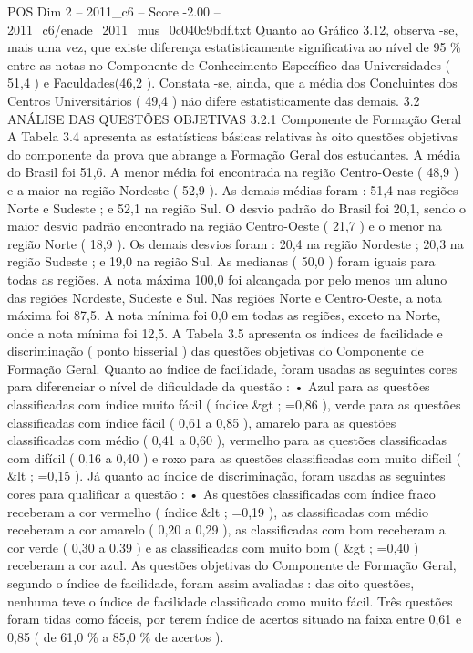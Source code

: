 \begin{textsample}{POS Dim 2 – 2011\_c6 – Score -2.00 – 2011\_c6/enade\_2011\_mus\_0c040c9bdf.txt}
Quanto ao Gráfico 3.12, observa -se, mais uma vez, que existe diferença estatisticamente significativa ao nível de 95 \% entre as notas no Componente de Conhecimento Específico das Universidades ( 51,4 ) e Faculdades(46,2 ).
Constata -se, ainda, que a média dos Concluintes dos Centros Universitários ( 49,4 ) não difere estatisticamente das demais. 3.2 ANÁLISE DAS QUESTÕES OBJETIVAS 3.2.1 Componente de Formação Geral A Tabela 3.4 apresenta as estatísticas básicas relativas às oito questões objetivas do componente da prova que abrange a Formação Geral dos estudantes.
A média do Brasil foi 51,6.
A menor média foi encontrada na região Centro-Oeste ( 48,9 ) e a maior na região Nordeste ( 52,9 ).
As demais médias foram : 51,4 nas regiões Norte e Sudeste ; e 52,1 na região Sul.
O desvio padrão do Brasil foi 20,1, sendo o maior desvio padrão encontrado na região Centro-Oeste ( 21,7 ) e o menor na região Norte ( 18,9 ).
Os demais desvios foram : 20,4 na região Nordeste ; 20,3 na região Sudeste ; e 19,0 na região Sul.
As medianas ( 50,0 ) foram iguais para todas as regiões.
A nota máxima 100,0 foi alcançada por pelo menos um aluno das regiões Nordeste, Sudeste e Sul.
Nas regiões Norte e Centro-Oeste, a nota máxima foi 87,5.
A nota mínima foi 0,0 em todas as regiões, exceto na Norte, onde a nota mínima foi 12,5.
A Tabela 3.5 apresenta os índices de facilidade e discriminação ( ponto bisserial ) das questões objetivas do Componente de Formação Geral.
Quanto ao índice de facilidade, foram usadas as seguintes cores para diferenciar o nível de dificuldade da questão : • Azul para as questões classificadas com índice muito fácil ( índice \&gt ; =0,86 ), verde para as questões classificadas com índice fácil ( 0,61 a 0,85 ), amarelo para as questões classificadas com médio ( 0,41 a 0,60 ), vermelho para as questões classificadas com difícil ( 0,16 a 0,40 ) e roxo para as questões classificadas com muito difícil ( \&lt ; =0,15 ).
Já quanto ao índice de discriminação, foram usadas as seguintes cores para qualificar a questão : • As questões classificadas com índice fraco receberam a cor vermelho ( índice \&lt ; =0,19 ), as classificadas com médio receberam a cor amarelo ( 0,20 a 0,29 ), as classificadas com bom receberam a cor verde ( 0,30 a 0,39 ) e as classificadas com muito bom ( \&gt ; =0,40 ) receberam a cor azul.
As questões objetivas do Componente de Formação Geral, segundo o índice de facilidade, foram assim avaliadas : das oito questões, nenhuma teve o índice de facilidade classificado como muito fácil.
Três questões foram tidas como fáceis, por terem índice de acertos situado na faixa entre 0,61 e 0,85 ( de 61,0 \% a 85,0 \% de acertos ).

\end{textsample}
